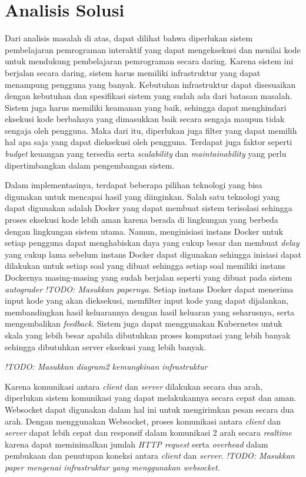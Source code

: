 \section{Analisis Solusi}
Dari analisis masalah di atas, dapat dilihat bahwa diperlukan sistem pembelajaran pemrograman interaktif yang dapat mengeksekusi dan menilai kode untuk mendukung pembelajaran pemrograman secara daring. Karena sistem ini berjalan secara daring, sistem harus memiliki infrastruktur yang dapat menampung pengguna yang banyak. Kebutuhan infrastruktur dapat disesuaikan dengan kebutuhan dan spesifikasi sistem yang sudah ada dari batasan masalah. Sistem juga harus memiliki keamanan yang baik, sehingga dapat menghindari eksekusi kode berbahaya yang dimasukkan baik secara sengaja maupun tidak sengaja oleh pengguna. Maka dari itu, diperlukan juga filter yang dapat memilih hal apa saja yang dapat dieksekusi oleh pengguna. Terdapat juga faktor seperti \textit{budget} keuangan yang tersedia serta \textit{scalability} dan \textit{maintainability} yang perlu dipertimbangkan dalam pengembangan sistem.

Dalam implementasinya, terdapat beberapa pilihan teknologi yang bisa digunakan untuk mencapai hasil yang diinginkan. Salah satu teknologi yang dapat digunakan adalah Docker yang dapat membuat sistem terisolasi sehingga proses eksekusi kode lebih aman karena berada di lingkungan yang berbeda dengan lingkungan sistem utama. Namun, menginisiasi instans Docker untuk setiap pengguna dapat menghabiskan daya yang cukup besar dan membuat \textit{delay} yang cukup lama sebelum instans Docker dapat digunakan sehingga inisiasi dapat dilakukan untuk setiap soal yang dibuat sehingga setiap soal memiliki instans Dockernya masing-masing yang sudah berjalan seperti yang dibuat pada sistem \textit{autograder} \textit{!TODO: Masukkan papernya}. Setiap instans Docker dapat menerima input kode yang akan dieksekusi, memfilter input kode yang dapat dijalankan, membandingkan hasil keluarannya dengan hasil keluaran yang seharusnya, serta mengembalikan \textit{feedback}. Sistem juga dapat menggunakan Kubernetes untuk skala yang lebih besar apabila dibutuhkan proses komputasi yang lebih banyak sehingga dibutuhkan server eksekusi yang lebih banyak.

\textit{!TODO: Masukkan diagram2 kemungkinan infrastruktur}

Karena komunikasi antara \textit{client} dan \textit{server} dilakukan secara dua arah, diperlukan sistem komunikasi yang dapat melakukannya secara cepat dan aman. Websocket dapat digunakan dalam hal ini untuk mengirimkan pesan secara dua arah. Dengan menggunakan Websocket, proses komunikasi antara \textit{client} dan \textit{server} dapat lebih cepat dan responsif dalam komunikasi 2 arah secara \textit{realtime} karena dapat meminimalkan jumlah \textit{HTTP request} serta \textit{overhead} dalam pembukaan dan penutupan koneksi antara \textit{client} dan \textit{server}. \textit{!TODO: Masukkan paper mengenai infrastruktur yang menggunakan websocket}.

